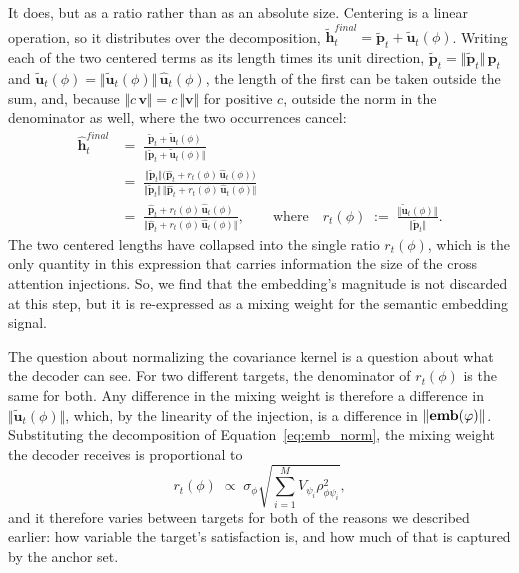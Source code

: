 \documentclass[titlepage,a4paper,11pt]{report}
\begin{document}
    It does, but as a ratio rather than as an absolute size. Centering is a linear operation, so it distributes over the decomposition, $\bm{\tilde h}^{final}_t = \bm{\tilde p}_t + \bm{\tilde u}_t(\phi)$. Writing each of the two centered terms as its length times its unit direction, $\bm{\tilde p}_t = \Vert\bm{\tilde p}_t\Vert\,\bm{\hat p}_t$ and $\bm{\tilde u}_t(\phi) = \Vert\bm{\tilde u}_t(\phi)\Vert\,\bm{\hat u}_t(\phi)$, the length of the first can be taken outside the sum, and, because $\Vert c\,\bm v\Vert = c\,\Vert\bm v\Vert$ for positive $c$, outside the norm in the denominator as well, where the two occurrences cancel:
    \begin{equation}\label{eq:ln_mixture}
    \begin{split}
        \bm{\hat h}^{final}_t
        & =\; \frac{\bm{\tilde p}_t + \bm{\tilde u}_t(\phi)}{\bigl\Vert \bm{\tilde p}_t + \bm{\tilde u}_t(\phi) \bigr\Vert} \\[4pt]
        & =\; \frac{\Vert\bm{\tilde p}_t\Vert \bigl( \bm{\hat p}_t + r_t(\phi)\,\bm{\hat u}_t(\phi) \bigr)}{\Vert\bm{\tilde p}_t\Vert \, \bigl\Vert \bm{\hat p}_t + r_t(\phi)\,\bm{\hat u}_t(\phi) \bigr\Vert} \\[4pt]
        & =\; \frac{\bm{\hat p}_t + r_t(\phi)\,\bm{\hat u}_t(\phi)}{\bigl\Vert \bm{\hat p}_t + r_t(\phi)\,\bm{\hat u}_t(\phi) \bigr\Vert},
        \qquad\text{where}\quad
        r_t(\phi) \;:=\; \frac{\bigl\Vert \bm{\tilde u}_t(\phi) \bigr\Vert}{\bigl\Vert \bm{\tilde p}_t \bigr\Vert} .
    \end{split}
    \end{equation}
    The two centered  lengths have collapsed into the single ratio $r_t(\phi)$, which is the only quantity in this expression that carries information the size of the cross attention injections. So, we find that the embedding's magnitude is not discarded at this step, but it is re-expressed as a mixing weight for the semantic embedding signal.

    The question about normalizing the covariance kernel is a question about what the decoder can see. For two different targets, the denominator of $r_t(\phi)$ is the same for both. Any difference in the mixing weight is therefore a difference in $\Vert\widetilde{\bm u}_t(\phi)\Vert$, which, by the linearity of the injection, is a difference in $\Vert\textbf{emb}(\varphi)\Vert$. Substituting the decomposition of Equation~\eqref{eq:emb_norm}, the mixing weight the decoder receives is proportional to
    \begin{equation}\label{eq:r_factored}
        r_t(\phi) \;\propto\; \sigma_\phi \sqrt{\sum_{i=1}^{M} V_{\psi_i} \rho^2_{\phi\psi_i}},
    \end{equation}
    and it therefore varies between targets for both of the reasons we described earlier: how variable the target's satisfaction is, and how much of that is captured by the anchor set.
\end{document}
